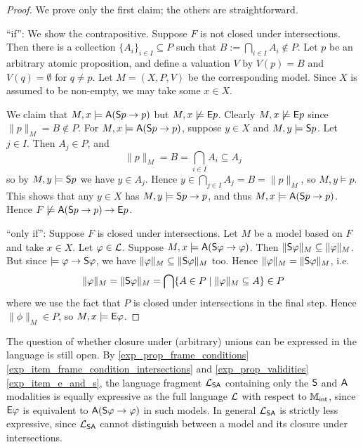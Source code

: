 \begin{proof}

    We prove only the first claim; the others are straightforward.

    ``if'': We show the contrapositive. Suppose $F$ is not closed under
    intersections. Then there is a collection $\{A_i\}_{i \in I} \subseteq P$
    such that $B := \bigcap_{i \in I}A_i \notin P$. Let $p$ be an arbitrary
    atomic proposition, and define a valuation $V$ by $V(p) = B$ and $V(q) =
    \emptyset$ for $q \ne p$. Let $M = (X, P, V)$ be the corresponding model.
    Since $X$ is assumed to be non-empty, we may take some $x \in X$.

    We claim that $M, x \models \A(\S p \limplies p)$ but $M, x
    \not\models \E p$. Clearly $M, x \not\models \E p$ since
    $\|p\|_M = B \notin P$. For $M, x \models \A(\S p \limplies
    p)$, suppose $y \in X$ and $M, y \models \S p$. Let $j
    \in I$. Then $A_j \in P$, and
    \[
        \|p\|_M
        = B
        = \bigcap_{i \in I}{A_i}
        \subseteq A_j
    \]
    so by $M, y \models \S p$ we have $y \in A_j$. Hence $y
    \in \bigcap_{j \in I}A_j = B = \|p\|_M$, so $M, y \models p$. This
    shows that any $y \in X$ has $M, y \models \S p \limplies p$,
    and thus $M, x \models \A(\S p \limplies p)$. Hence $F
    \not\models \A(\S p \limplies p) \limplies \E p$.

    ``only if'': Suppose $F$ is closed under intersections. Let $M$
    be a model based on $F$ and take $x \in X$. Let $\phi
    \in \cL$. Suppose $M, x \models \A(\S\phi \limplies \phi)$. Then
    $\|\S\phi\|_M \subseteq \|\phi\|_M$. But since $\models \phi
    \limplies \S\phi$, we have $\|\phi\|_M \subseteq \|\S\phi\|_M$ too.
    Hence $\|\phi\|_M = \|\S\phi\|_M$, i.e.
    \[
        \|\phi\|_M
        = \|\S\phi\|_M
        = \bigcap\{A \in P \mid \|\phi\|_M \subseteq A\}
        \in P
    \]
    where we use the fact that $P$ is closed under intersections in the
    final step. Hence $\|\phi\|_M \in P$, so $M, x \models
    \E\phi$.
\end{proof}

The question of whether closure under (arbitrary) unions can be expressed in
the language is still open. By \cref{exp_prop_frame_conditions}
\cref{exp_item_frame_condition_intersections} and \cref{exp_prop_validities}
\cref{exp_item_e_and_s}, the language fragment $\cLSA$ containing only the $\S$
and $\A$ modalities is equally expressive as the full language $\cL$ with
respect to $\Mint$, since $\E\phi$ is equivalent to $\A(\S\phi \limplies \phi)$
in such models. In general $\cLSA$ is strictly less expressive, since $\cLSA$
cannot distinguish between a model and its closure under intersections.

